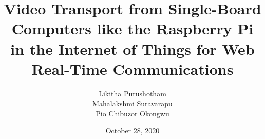 \author{Likitha Purushotham \\ Mahalakshmi Suravarapu \\ Pio Chibuzor Okongwu}
\title{Video Transport from Single-Board Computers like the Raspberry Pi in the Internet of Things for Web Real-Time Communications}
\date{October 28, 2020}

\newlanguagecommand{\semester}

\newcommand{\supervisor}{Prof. Dr. Udo Krieger \& Marcel Großmann}

\gitfalse
